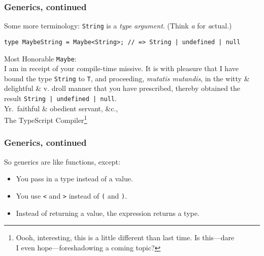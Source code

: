 \documentclass{beamer}
\begin{document}
\begin{frame}[fragile]
  \frametitle{Generics, continued}
  \small

  Some more terminology: \texttt{String} is a \emph{type} \textit{argument}.
  (Think \textit{a} for \textit{a}ctual.)

  \vspace{1em}

  \footnotesize
  \begin{verbatim}
type MaybeString = Maybe<String>; // => String | undefined | null
  \end{verbatim}
  \small

  \vspace{1em}

  \begin{tcolorbox}
    Most Honorable \texttt{Maybe}: \\

    I am in receipt of your compile-time missive. It is with pleasure that
    I have bound the type \texttt{String} to \texttt{T}, and proceeding,
    \textit{mutatis mutandis}, in the witty \& delightful \& v. droll manner
    that you have prescribed, thereby obtained the result
    \texttt{String | undefined | null}. \\

    Yr.\ faithful \& obedient servant, \&c., \\
    The TypeScript Compiler\footnote{Oooh, interesting, this is a little
      different than last time. Is this---dare \\ I even hope---foreshadowing
      a coming topic?}
  \end{tcolorbox}
\end{frame}


\begin{frame}
  \frametitle{Generics, continued}

  So generics are like functions, except: \\

  \begin{itemize}
    \item You pass in a type instead of a value.
    \item You use \texttt{<} and \texttt{>} instead of \texttt{(} and
          \texttt{)}.
    \item Instead of returning a value, the expression returns a type.
  \end{itemize}
\end{frame}

\end{document}
